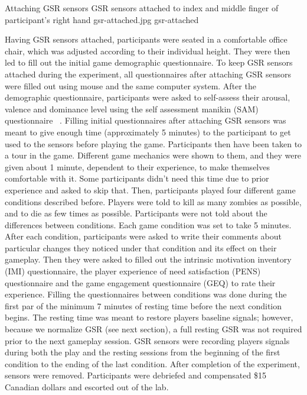 \img
{Attaching GSR sensors}
{GSR sensors attached to index and middle finger of participant's right hand}
{gsr-attached.jpg}
{gsr-attached}

Having GSR sensors attached, participants were seated in a comfortable office chair, which was adjusted according to their individual height. They were then led to fill out the initial game demographic questionnaire. To keep GSR sensors attached during the experiment, all questionnaires after attaching GSR sensors were filled out using mouse and the same computer system. After the demographic questionnaire, participants were asked to self-assess their arousal, valence and dominance level using the self assessment manikin (SAM) questionnaire ~\cite{bradley1994measuring}. Filling initial questionnaires after attaching GSR sensors was meant to give enough time (approximately 5 minutes) to the participant to get used to the sensors before playing the game. Participants then have been taken to a tour in the game. Different game mechanics were shown to them, and they were given about 1 minute, dependent to their experience, to make themselves comfortable with it. Some participants didn't need this time due to prior experience and asked to skip that. Then, participants played four different game conditions described before. Players were told to kill as many zombies as possible, and to die as few times as possible. Participants were not told about the differences between conditions. Each game condition was set to take 5 minutes. After each condition, participants were asked to write their comments about particular changes they noticed under that condition and its effect on their gameplay. Then they were asked to filled out the intrinsic motivation inventory (IMI) questionnaire, the player experience of need satisfaction (PENS) questionnaire and the game engagement questionnaire (GEQ) to rate their experience. Filling the questionnaires between conditions was done during the first par of the minimum 7 minutes of resting time before the next condition begins. The resting time was meant to restore players baseline signals; however, because we normalize GSR (see next section), a full resting GSR was not required prior to the next gameplay session. GSR sensors were recording players signals during both the play and the resting sessions from the beginning of the first condition to the ending of the last condition. After completion of the experiment, sensors were removed. Participants were debriefed and compensated \$15 Canadian dollars and escorted out of the lab.


